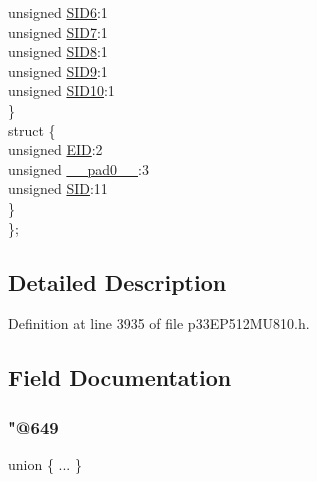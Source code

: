 \begin{DoxyCompactItemize}
\begin{tabbing}
\>\>unsigned \hyperlink{structtag_c1_r_x_f4_s_i_d_b_i_t_s_a70d70952133eb2389d5c326f9f0e8035}{SID6}:1\\
\>\>unsigned \hyperlink{structtag_c1_r_x_f4_s_i_d_b_i_t_s_a34097fb76decd431701fa2d86a22328e}{SID7}:1\\
\>\>unsigned \hyperlink{structtag_c1_r_x_f4_s_i_d_b_i_t_s_afe74894633244fdb0b0c01b4e8c522e7}{SID8}:1\\
\>\>unsigned \hyperlink{structtag_c1_r_x_f4_s_i_d_b_i_t_s_a33587704948067005c2a6a3ccc503c99}{SID9}:1\\
\>\>unsigned \hyperlink{structtag_c1_r_x_f4_s_i_d_b_i_t_s_a1a9084031c7f5fb16007feeebf0d8216}{SID10}:1\\
\>\} \\
\>struct \{\\
\>\>unsigned \hyperlink{structtag_c1_r_x_f4_s_i_d_b_i_t_s_ae80b378c9141f7c03e0b4e55b5f4b54d}{EID}:2\\
\>\>unsigned \hyperlink{structtag_c1_r_x_f4_s_i_d_b_i_t_s_adf71f3d8410c1f1dbbc96680a92c49af}{\_\_pad0\_\_}:3\\
\>\>unsigned \hyperlink{structtag_c1_r_x_f4_s_i_d_b_i_t_s_af88edf93b2fee2432665bd84f51287e4}{SID}:11\\
\>\} \\
\}; \\

\end{tabbing}\end{DoxyCompactItemize}


\subsection{Detailed Description}


Definition at line 3935 of file p33\+E\+P512\+M\+U810.\+h.



\subsection{Field Documentation}
\mbox{\label{structtag_c1_r_x_f4_s_i_d_b_i_t_s_a36c74e11993453118cc660441157278c}} 
\subsubsection{\texorpdfstring{"@649}{@649}}
{\footnotesize\ttfamily union \{ ... \} }

\mbox{\label{structtag_c1_r_x_f4_s_i_d_b_i_t_s_adf71f3d8410c1f1dbbc96680a92c49af}} 

